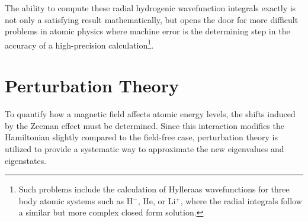             The ability to compute these radial hydrogenic wavefunction integrals exactly is not only a satisfying result mathematically, but opens the door for more difficult problems in atomic physics where machine error is the determining step in the accuracy of a high-precision calculation\footnote{Such problems include the calculation of Hylleraas wavefunctions for three body atomic systems such as H$^-$, He, or Li$^+$, where the radial integrals follow a similar but more complex closed form solution.}.
            
    \section{Perturbation Theory} \label{sec:Perturbation_Theory}
        To quantify how a magnetic field affects atomic energy levels, the shifts induced by the Zeeman effect must be determined. Since this interaction modifies the Hamiltonian slightly compared to the field-free case, perturbation theory is utilized to provide a systematic way to approximate the new eigenvalues and eigenstates.\\

